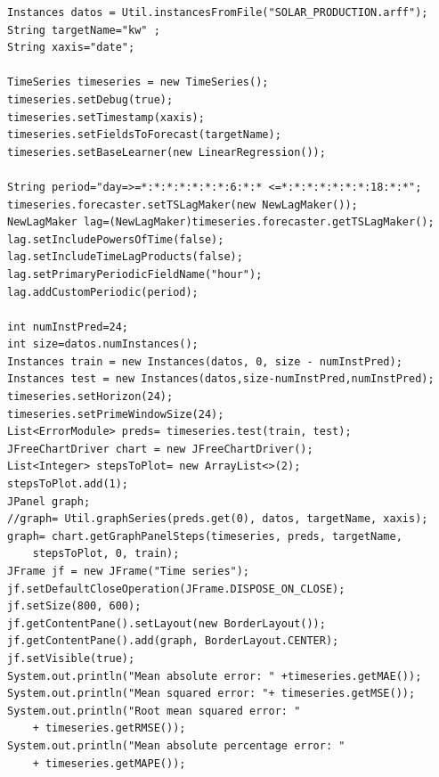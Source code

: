 
\begin{lstlisting}[frame=single]  
Instances datos = Util.instancesFromFile("SOLAR_PRODUCTION.arff");
String targetName="kw" ;
String xaxis="date";

TimeSeries timeseries = new TimeSeries();
timeseries.setDebug(true);
timeseries.setTimestamp(xaxis);
timeseries.setFieldsToForecast(targetName);
timeseries.setBaseLearner(new LinearRegression());

String period="day=>=*:*:*:*:*:*:*:6:*:* <=*:*:*:*:*:*:*:18:*:*";
timeseries.forecaster.setTSLagMaker(new NewLagMaker());
NewLagMaker lag=(NewLagMaker)timeseries.forecaster.getTSLagMaker();
lag.setIncludePowersOfTime(false);
lag.setIncludeTimeLagProducts(false);
lag.setPrimaryPeriodicFieldName("hour"); 
lag.addCustomPeriodic(period);

int numInstPred=24;
int size=datos.numInstances();
Instances train = new Instances(datos, 0, size - numInstPred);
Instances test = new Instances(datos,size-numInstPred,numInstPred);
timeseries.setHorizon(24);
timeseries.setPrimeWindowSize(24);
List<ErrorModule> preds= timeseries.test(train, test);
JFreeChartDriver chart = new JFreeChartDriver();
List<Integer> stepsToPlot= new ArrayList<>(2);
stepsToPlot.add(1);
JPanel graph;
//graph= Util.graphSeries(preds.get(0), datos, targetName, xaxis);
graph= chart.getGraphPanelSteps(timeseries, preds, targetName,
	stepsToPlot, 0, train);
JFrame jf = new JFrame("Time series");
jf.setDefaultCloseOperation(JFrame.DISPOSE_ON_CLOSE);
jf.setSize(800, 600);
jf.getContentPane().setLayout(new BorderLayout());
jf.getContentPane().add(graph, BorderLayout.CENTER);
jf.setVisible(true);
System.out.println("Mean absolute error: " +timeseries.getMAE());
System.out.println("Mean squared error: "+ timeseries.getMSE());
System.out.println("Root mean squared error: "
	+ timeseries.getRMSE());
System.out.println("Mean absolute percentage error: " 
	+ timeseries.getMAPE());
\end{lstlisting}


